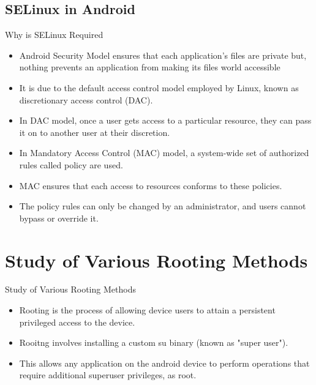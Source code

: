 \documentclass{beamer}
\begin{document}
\subsection{SELinux in Android}
\begin{frame}[allowframebreaks]{Why is SELinux Required}
    \begin{itemize}
        \item Android Security Model ensures that each application's files are private but, nothing prevents an application from making its files world accessible
        \item It is due to the default access control model employed by Linux, known as discretionary access control (DAC).
        \item In DAC model, once a user gets access to a particular resource, they can pass it on to another user at their discretion.
    \end{itemize}
    \framebreak
    \begin{itemize}
        \item In Mandatory Access Control (MAC) model, a system-wide set of authorized rules called policy are used. 
        \item MAC ensures that each access to resources conforms to these policies. 
        \item The policy rules can only be changed by an administrator, and users cannot bypass or override it.
    \end{itemize}
\end{frame}

\section{Study of Various Rooting Methods}
\begin{frame}{Study of Various Rooting Methods}
    \begin{itemize}
        \item Rooting is the process of allowing device users to attain a persistent privileged access to the device.
        \item Rooitng involves installing a custom su binary (known as "super user").
        \item This allows any application on the android device to perform operations that require additional superuser privileges, as root.
    \end{itemize}
\end{frame}
\end{document}
